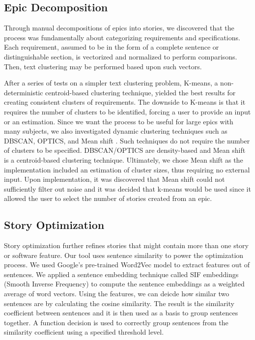 \subsection{Epic Decomposition}
Through manual decompositions of epics into stories, we discovered that the process was fundamentally about categorizing requirements and specifications. Each requirement, assumed to be in the form of a complete sentence or distinguishable section, is vectorized and normalized to perform comparisons. Then, text clustering may be performed based upon such vectors. 

After a series of tests on a simpler text clustering problem, K-means, a non-deterministic centroid-based clustering technique, yielded the best results for creating consistent clusters of requirements. The downside to K-means is that it requires the number of clusters to be identified, forcing a user to provide an input or an estimation. Since we want the process to be useful for large epics with many subjects, we also investigated dynamic clustering techniques such as DBSCAN, OPTICS, and Mean shift \cite{}. Such techniques do not require the number of clusters to be specified. DBSCAN/OPTICS are density-based and Mean shift is a centroid-based clustering technique. Ultimately, we chose Mean shift as the implementation included an estimation of cluster sizes, thus requiring no external input. Upon implementation, it was discovered that Mean shift could not sufficiently filter out noise and it was decided that k-means would be used since it allowed the user to select the number of stories created from an epic.

\subsection{Story Optimization}

Story optimization further refines stories that might contain more than one story or software feature. Our tool uses sentence similarity to power the optimization process. We used Google's pre-trained Word2Vec model\cite{googleword2vec} to extract features out of sentences. We applied a sentence embedding technique called SIF embeddings (Smooth Inverse Frequency) to compute the sentence embeddings as a weighted average of word vectors. Using the features, we can deicde how similar two sentences are by calculating the cosine similarity. 
The result is the similarity coefficient between sentences and it is then used as a basis to group sentences together. A function decision is used to correctly group sentences from the similarity coefficient using a specified threshold level. 

